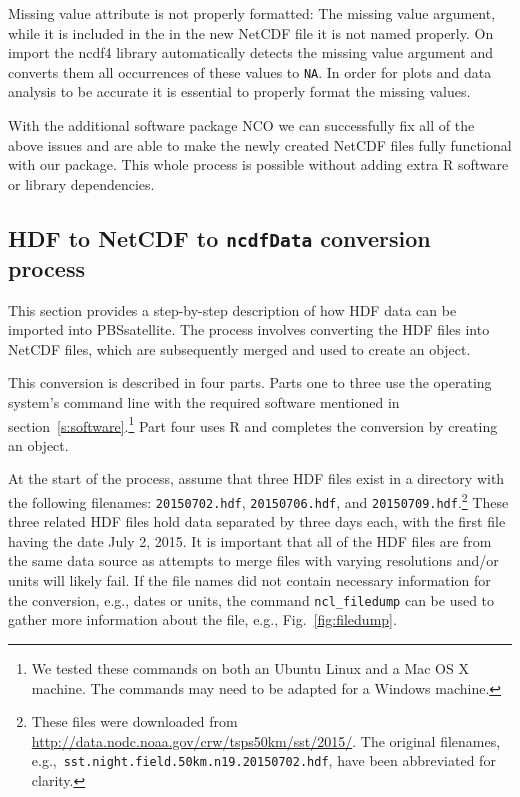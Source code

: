 \documentclass[11pt]{report}
\begin{document}
Missing value attribute is not properly formatted:
The missing value argument, while it is included in the in the new NetCDF file it is not named properly.
On import the ncdf4 library automatically detects the missing value argument and converts them all occurrences of these values to \lstinline{NA}.
In order for plots and data analysis to be accurate it is essential to properly format the missing values. 

With the additional software package NCO we can successfully fix all of the above issues and are able to make the newly created NetCDF files fully functional with our package.
This whole process is possible without adding extra R software or library dependencies.

\subsection{HDF to NetCDF to \texttt{ncdfData} conversion process}
\label{s:conversion}

This section provides a step-by-step description of how HDF data can be imported into PBSsatellite.
The process involves converting the HDF files into NetCDF files, which are subsequently merged and used to create an  object.

This conversion is described in four parts.
Parts one to three use the operating system's command line with the required software mentioned in section~\ref{s:software}.\footnote{
  We tested these commands on both an Ubuntu Linux and a Mac OS X machine.
  The commands may need to be adapted for a Windows machine.}
Part four uses R and completes the conversion by creating an  object.

At the start of the process, assume that three HDF files exist in a directory with the following filenames: \texttt{20150702.hdf}, \texttt{20150706.hdf}, and \texttt{20150709.hdf}.\footnote{
  These files were downloaded from \url{http://data.nodc.noaa.gov/crw/tsps50km/sst/2015/}.
  The original filenames, e.g.,~\texttt{sst.night.field.50km.n19.20150702.hdf}, have been abbreviated for clarity.}
These three related HDF files hold data separated by three days each, with the first file having the date July 2, 2015.
It is important that all of the HDF files are from the same data source as attempts to merge files with varying resolutions and/or units will likely fail.
If the file names did not contain necessary information for the conversion, e.g., dates or units, the command \texttt{ncl\_filedump} can be used to gather more information about the file, e.g., Fig.~\ref{fig:filedump}.
\end{document}
